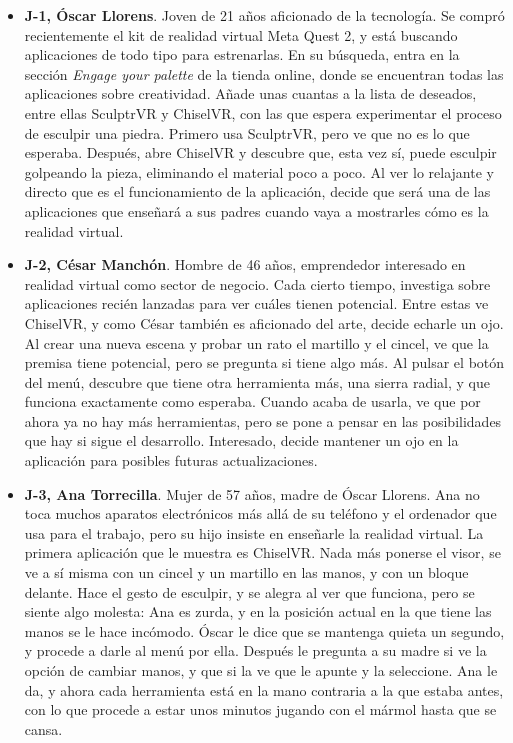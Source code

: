 \begin{itemize}
    \item \textbf{J-1, Óscar Llorens}. Joven de 21 años aficionado de la tecnología. Se compró recientemente el kit de realidad virtual Meta Quest 2, y está buscando aplicaciones de todo tipo para estrenarlas. En su búsqueda, entra en la sección \textit{Engage your palette} de la tienda online, donde se encuentran todas las aplicaciones sobre creatividad. Añade unas cuantas a la lista de deseados, entre ellas SculptrVR y ChiselVR, con las que espera experimentar el proceso de esculpir una piedra. Primero usa SculptrVR, pero ve que no es lo que esperaba. Después, abre ChiselVR y descubre que, esta vez sí, puede esculpir golpeando la pieza, eliminando el material poco a poco. Al ver lo relajante y directo que es el funcionamiento de la aplicación, decide que será una de las aplicaciones que enseñará a sus padres cuando vaya a mostrarles cómo es la realidad virtual.
    \item \textbf{J-2, César Manchón}. Hombre de 46 años, emprendedor interesado en realidad virtual como sector de negocio. Cada cierto tiempo, investiga sobre aplicaciones recién lanzadas para ver cuáles tienen potencial. Entre estas ve ChiselVR, y como César también es aficionado del arte, decide echarle un ojo. Al crear una nueva escena y probar un rato el martillo y el cincel, ve que la premisa tiene potencial, pero se pregunta si tiene algo más. Al pulsar el botón del menú, descubre que tiene otra herramienta más, una sierra radial, y que funciona exactamente como esperaba. Cuando acaba de usarla, ve que por ahora ya no hay más herramientas, pero se pone a pensar en las posibilidades que hay si sigue el desarrollo. Interesado, decide mantener un ojo en la aplicación para posibles futuras actualizaciones.
    \item \textbf{J-3, Ana Torrecilla}. Mujer de 57 años, madre de Óscar Llorens. Ana no toca muchos aparatos electrónicos más allá de su teléfono y el ordenador que usa para el trabajo, pero su hijo insiste en enseñarle la realidad virtual. La primera aplicación que le muestra es ChiselVR. Nada más ponerse el visor, se ve a sí misma con un cincel y un martillo en las manos, y con un bloque delante. Hace el gesto de esculpir, y se alegra al ver que funciona, pero se siente algo molesta: Ana es zurda, y en la posición actual en la que tiene las manos se le hace incómodo. Óscar le dice que se mantenga quieta un segundo, y procede a darle al menú por ella. Después le pregunta a su madre si ve la opción de cambiar manos, y que si la ve que le apunte y la seleccione. Ana le da, y ahora cada herramienta está en la mano contraria a la que estaba antes, con lo que procede a estar unos minutos jugando con el mármol hasta que se cansa.
\end{itemize}

